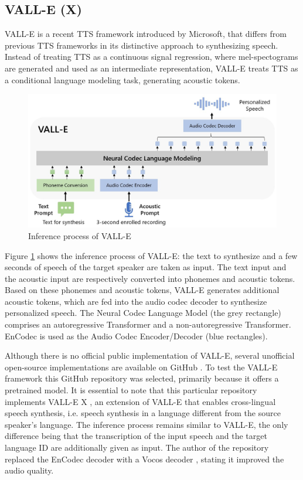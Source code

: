 \subsection{VALL-E (X)}
VALL-E \cite{wang2301neural} is a recent TTS framework introduced by Microsoft, that differs from previous TTS frameworks in its distinctive approach to synthesizing speech. Instead of treating TTS as a continuous signal regression, where mel-spectograms are generated and used as an intermediate representation, VALL-E treats TTS as a conditional language modeling task, generating acoustic tokens.

\begin{figure}[h!]
    \centering
    \includegraphics[width=1\linewidth]{assets/VALLE_Overview.jpg}
    \caption{Inference process of VALL-E \cite{wang2301neural}}
    \label{fig:valle_overview}
\end{figure}

Figure \ref{fig:valle_overview} shows the inference process of VALL-E: the text to synthesize and a few seconds of speech of the target speaker are taken as input. The text input and the acoustic input are respectively converted into phonemes and acoustic tokens. Based on these phonemes and acoustic tokens, VALL-E generates additional acoustic tokens, which are fed into the audio codec decoder to synthesize personalized speech. The Neural Codec Language Model (the grey rectangle) comprises an autoregressive Transformer and a non-autoregressive Transformer. EnCodec \cite{defossez2022high} is used as the Audio Codec Encoder/Decoder (blue rectangles). 

Although there is no official public implementation of VALL-E, several unofficial open-source implementations are available on GitHub \cite{valle, niu_vall-e_2023, songting_vall-e_2023}. To test the VALL-E framework this GitHub repository \cite{songting_vall-e_2023} was selected, primarily because it offers a pretrained model. It is essential to note that this particular repository implements VALL-E X \cite{zhang2023speak}, an extension of VALL-E that enables cross-lingual speech synthesis, i.e. speech synthesis in a language different from the source speaker's language. The inference process remains similar to VALL-E, the only difference being that the transcription of the input speech and the target language ID are additionally given as input. The author of the repository replaced the EnCodec decoder with a Vocos decoder \cite{siuzdak2023vocos}, stating it improved the audio quality. 

